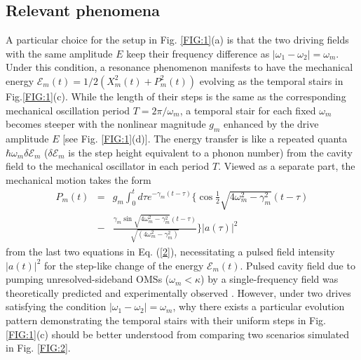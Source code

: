 \documentclass[a4paper,fleqn]{cas-dc}
\begin{document}
\subsection{Relevant phenomena}
A particular choice for the setup in Fig. \ref{FIG:1}(a) is that the two driving fields with the same amplitude $E$ keep their frequency difference as $|\omega_1-\omega_2|=\omega_m$. Under this condition, a resonance phenomenon manifests to have the mechanical energy $\mathcal{E}_m(t)=1/2\left(X_m^2(t)+P_m^2(t)\right)$ evolving as the temporal stairs in Fig.\ref{FIG:1}(c). While the length of their steps is the same as the corresponding mechanical oscillation period $T=2\pi/\omega_m$, a temporal stair for each fixed $\omega_m$ becomes steeper with the nonlinear magnitude $g_m$ enhanced by the drive amplitude $E$ [see Fig. \ref{FIG:1}(d)]. The energy transfer is like a repeated quanta $\hbar\omega_m \delta\mathcal{E}_m$ ($\delta\mathcal{E}_m$ is the step height equivalent to a phonon number) from the cavity field to the mechanical oscillator in each period $T$. Viewed as a separate part, the mechanical motion takes the form
\begin{eqnarray}
P_m(t)&=&g_m\int_0^t d\tau e^{-\gamma_m (t-\tau)}\{\cos\frac{1}{2}\sqrt{4\omega_m^2-\gamma_m^2}(t-\tau)\nonumber\\
&-&\frac{\gamma_m\sin\sqrt{4\omega_m^2-\gamma_m^2}(t-\tau)}{\sqrt{(4\omega_m^2-\gamma_m^2)}}\}|a(\tau)|^2
\label{sol}
\end{eqnarray}
from the last two equations in Eq. (\ref{2}), necessitating a pulsed field intensity $|a(t)|^2$ for the step-like change 
of the energy $\mathcal{E}_m(t)$. Pulsed cavity field due to pumping unresolved-sideband OMSs ($\omega_m<\kappa$) by a single-frequency field was theoretically predicted \cite{poot2012backaction,miri2018optomechanical,xu2021chip} and experimentally observed \cite{hu2021generation}. However, under two drives satisfying the condition $|\omega_1-\omega_2|=\omega_m$, why there exists a particular evolution pattern demonstrating the temporal stairs with their uniform steps in Fig. \ref{FIG:1}(c) should be better understood from comparing two scenarios simulated in Fig. \ref{FIG:2}.
\end{document}
